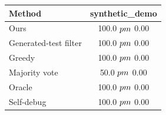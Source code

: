 \begin{tabular}{lc}
\toprule
Method & synthetic_demo \\
\midrule
Ours & 100.0 $\\pm$ 0.00 \\
Generated-test filter & 100.0 $\\pm$ 0.00 \\
Greedy & 100.0 $\\pm$ 0.00 \\
Majority vote & 50.0 $\\pm$ 0.00 \\
Oracle & 100.0 $\\pm$ 0.00 \\
Self-debug & 100.0 $\\pm$ 0.00 \\
\bottomrule
\end{tabular}
